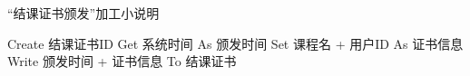 \begin{algorithm}[H]
    \renewcommand{\thealgorithm}{}
    \caption{“结课证书颁发”加工小说明} 
    \label{alg3} 
    \begin{algorithmic}[1]
        \STATE Create 结课证书ID
        \STATE Get 系统时间 As 颁发时间
        \STATE Set 课程名 + 用户ID As 证书信息
        \STATE Write 颁发时间 + 证书信息 To 结课证书
    \end{algorithmic} 
\end{algorithm}